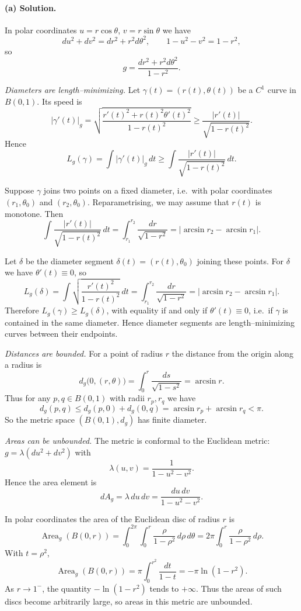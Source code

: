 \documentclass[12pt,a4paper]{article}
\theoremstyle{plain}
\theoremstyle{definition}      %
\begin{document}
	\paragraph{(a) Solution.}
	
	In polar coordinates $u=r\cos\theta$, $v=r\sin\theta$ we have
	\[
	du^2+dv^2 = dr^2 + r^2d\theta^2,\qquad 1-u^2-v^2 = 1-r^2,
	\]
	so
	\[
	g = \frac{dr^2+r^2d\theta^2}{1-r^2}.
	\]
	
	\medskip\noindent
	\emph{Diameters are length–minimizing.}
	Let $\gamma(t)=(r(t),\theta(t))$ be a $C^1$ curve in $B(0,1)$.
	Its speed is
	\[
	|\gamma'(t)|_g
	= \sqrt{\frac{r'(t)^2 + r(t)^2\theta'(t)^2}{1-r(t)^2}}
	\ge \frac{|r'(t)|}{\sqrt{1-r(t)^2}}.
	\]
	Hence
	\[
	L_g(\gamma)
	= \int |\gamma'(t)|_g\,dt
	\ge \int \frac{|r'(t)|}{\sqrt{1-r(t)^2}}\,dt.
	\]
	
	Suppose $\gamma$ joins two points on a fixed diameter, i.e.\ with polar
	coordinates $(r_1,\theta_0)$ and $(r_2,\theta_0)$. Reparametrising, we may
	assume that $r(t)$ is monotone. Then
	\[
	\int \frac{|r'(t)|}{\sqrt{1-r(t)^2}}\,dt
	= \int_{r_1}^{r_2} \frac{dr}{\sqrt{1-r^2}}
	= \bigl|\arcsin r_2 - \arcsin r_1\bigr|.
	\]
	
	Let $\delta$ be the diameter segment
	$\delta(t)=(r(t),\theta_0)$ joining these points. For $\delta$ we have
	$\theta'(t)\equiv 0$, so
	\[
	L_g(\delta)
	= \int \sqrt{\frac{r'(t)^2}{1-r(t)^2}}\,dt
	= \int_{r_1}^{r_2} \frac{dr}{\sqrt{1-r^2}}
	= \bigl|\arcsin r_2 - \arcsin r_1\bigr|.
	\]
	Therefore $L_g(\gamma)\ge L_g(\delta)$, with equality if and only if
	$\theta'(t)\equiv 0$, i.e.\ if $\gamma$ is contained in the same diameter.
	Hence diameter segments are length–minimizing curves between their endpoints.
	
	\medskip\noindent
	\emph{Distances are bounded.}
	For a point of radius $r$ the distance from the origin along a radius is
	\[
	d_g\bigl(0,(r,\theta)\bigr)
	= \int_0^r \frac{ds}{\sqrt{1-s^2}}
	= \arcsin r.
	\]
	Thus for any $p,q\in B(0,1)$ with radii $r_p,r_q$ we have
	\[
	d_g(p,q)
	\le d_g(p,0)+d_g(0,q)
	= \arcsin r_p + \arcsin r_q < \pi.
	\]
	So the metric space $(B(0,1),d_g)$ has finite diameter.
	
	\medskip\noindent
	\emph{Areas can be unbounded.}
	The metric is conformal to the Euclidean metric:
	$g = \lambda(du^2+dv^2)$ with
	\[
	\lambda(u,v) = \frac{1}{1-u^2-v^2}.
	\]
	Hence the area element is
	\[
	dA_g = \lambda\,du\,dv = \frac{du\,dv}{1-u^2-v^2}.
	\]
	
	In polar coordinates the area of the Euclidean disc of radius $r$ is
	\[
	\operatorname{Area}_g(B(0,r))
	= \int_0^{2\pi} \int_0^r \frac{\rho}{1-\rho^2}\,d\rho\,d\theta
	= 2\pi \int_0^r \frac{\rho}{1-\rho^2}\,d\rho.
	\]
	With $t=\rho^2$,
	\[
	\operatorname{Area}_g(B(0,r))
	= \pi\int_0^{r^2} \frac{dt}{1-t}
	= -\pi\ln(1-r^2).
	\]
	As $r\to 1^-$, the quantity $-\ln(1-r^2)$ tends to $+\infty$.
	Thus the areas of such discs become arbitrarily large, so areas
	in this metric are unbounded.
	
\end{document}
